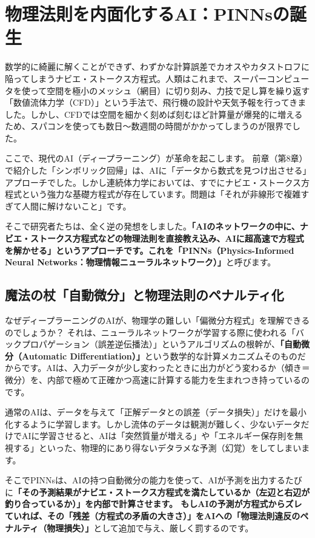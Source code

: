 \section{物理法則を内面化するAI：PINNsの誕生}

数学的に綺麗に解くことができず、わずかな計算誤差でカオスやカタストロフに陥ってしまうナビエ・ストークス方程式。人類はこれまで、スーパーコンピュータを使って空間を極小のメッシュ（網目）に切り刻み、力技で足し算を繰り返す「数値流体力学（CFD）」という手法で、飛行機の設計や天気予報を行ってきました。しかし、CFDでは空間を細かく刻めば刻むほど計算量が爆発的に増えるため、スパコンを使っても数日〜数週間の時間がかかってしまうのが限界でした。

ここで、現代のAI（ディープラーニング）が革命を起こします。 前章（第8章）で紹介した「シンボリック回帰」は、AIに「データから数式を見つけ出させる」アプローチでした。しかし連続体力学においては、すでにナビエ・ストークス方程式という強力な基礎方程式が存在しています。問題は「それが非線形で複雑すぎて人間に解けないこと」です。

そこで研究者たちは、全く逆の発想をしました。\textbf{「AIのネットワークの中に、ナビエ・ストークス方程式などの物理法則を直接教え込み、AIに超高速で方程式を解かせる」というアプローチです。これを「PINNs（Physics-Informed Neural Networks：物理情報ニューラルネットワーク）」}と呼びます。

\subsection{魔法の杖「自動微分」と物理法則のペナルティ化}

なぜディープラーニングのAIが、物理学の難しい「偏微分方程式」を理解できるのでしょうか？ それは、ニューラルネットワークが学習する際に使われる「バックプロパゲーション（誤差逆伝播法）」というアルゴリズムの根幹が、\textbf{「自動微分（Automatic Differentiation）」}という数学的な計算メカニズムそのものだからです。AIは、入力データが少し変わったときに出力がどう変わるか（傾き＝微分）を、内部で極めて正確かつ高速に計算する能力を生まれつき持っているのです。

通常のAIは、データを与えて「正解データとの誤差（データ損失）」だけを最小化するように学習します。しかし流体のデータは観測が難しく、少ないデータだけでAIに学習させると、AIは「突然質量が増える」や「エネルギー保存則を無視する」といった、物理的にあり得ないデタラメな予測（幻覚）をしてしまいます。

そこでPINNsは、AIの持つ自動微分の能力を使って、AIが予測を出力するたびに\textbf{「その予測結果がナビエ・ストークス方程式を満たしているか（左辺と右辺が釣り合っているか）」を内部で計算させます。 もしAIの予測が方程式からズレていれば、その「残差（方程式の矛盾の大きさ）」をAIへの「物理法則違反のペナルティ（物理損失）」}として追加で与え、厳しく罰するのです。


